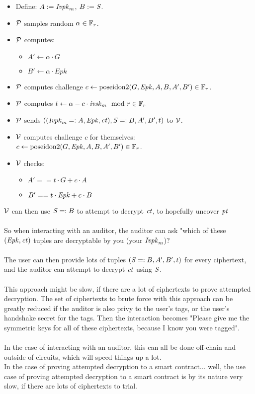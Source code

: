 \begin{itemize}
    \item Define: $A := \Ivpkm$, $B := \sharedsecret$.
    \item $\P$ samples random $\alpha \in \Fr$.
    \item $\P$ computes:
    \begin{itemize}
        \item $A' \leftarrow \alpha \cdot G$
        \item $B' \leftarrow \alpha \cdot Epk$
    \end{itemize} 
    \item $\P$ computes challenge $c \leftarrow \poseidon(G, \Epk, A, B, A', B') \in \Fr$. 
    \item $\P$ computes $t \leftarrow  \alpha - c \cdot \ivskm  \mod r \in \Fr$
    \item $\P$ sends $((\Ivpkm =: A, \Epk, \ct), \sharedsecret =: B, A', B', t)$ to $\V$.
    \item $\V$ computes challenge $c$ for themselves: $c \leftarrow \poseidon(G, \Epk, A, B, A', B') \in \Fr$.
    \item $\V$ checks:
    \begin{itemize}
        \item $A' == t \cdot G + c \cdot A$
        \item $B' == t \cdot \Epk + c \cdot B$
    \end{itemize}
\end{itemize}
\noindent
$\V$ can then use $\sharedsecret =: B$ to attempt to decrypt $\ct$, to hopefully uncover $\pt$\\
\\
So when interacting with an auditor, the auditor can ask "which of these $(\Epk, \ct)$ tuples are decryptable by you (your $\Ivpkm$)?\\
\\
The user can then provide lots of tuples $(\sharedsecret =: B, A', B', t)$ for every ciphertext, and the auditor can attempt to decrypt $\ct$ using $\sharedsecret$.\\
\\
This approach might be slow, if there are a lot of ciphertexts to prove attempted decryption.
The set of ciphertexts to brute force with this approach can be greatly reduced if the auditor is also privy to the user's tags, or the user's handshake secret for the tags.
Then the interaction becomes "Please give me the symmetric keys for all of these ciphertexts, because I know you were tagged".\\
\\
In the case of interacting with an auditor, this can all be done off-chain and outside of circuits, which will speed things up a lot.
\\
In the case of proving attempted decryption to a smart contract... well, the use case of proving attempted decryption to a smart contract is by its nature very slow, if there are lots of ciphertexts to trial.